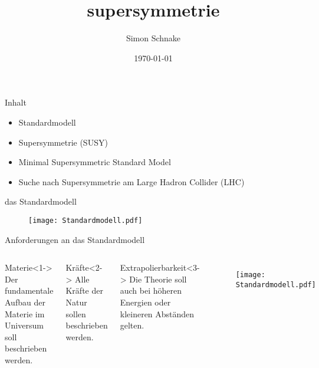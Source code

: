 \documentclass[10pt]{beamer}
\title{supersymmetrie}
\date{\today}
\author{Simon Schnake}
\institute{Universität Hamburg}
\begin{document}
  \maketitle
  
  \begin{frame}{Inhalt}
\begin{itemize}[<+- | alert@+>]
	\item Standardmodell
	\item Supersymmetrie (SUSY)
	\item Minimal Supersymmetric Standard Model
	\item Suche nach Supersymmetrie am Large Hadron Collider (LHC)
\end{itemize}
\end{frame}
  
  
\begin{frame}{das Standardmodell}
	\begin{figure}[htp]
    	\texttt{[image: Standardmodell.pdf]}
    \end{figure}
\end{frame}  

\begin{frame}{Anforderungen an das Standardmodell}
  \begin{columns}[c,onlytextwidth]
		\begin{block}{Materie}<1->
		Der fundamentale Aufbau der Materie im Universum soll beschrieben werden.
		\end{block}
		\begin{block}{Kräfte}<2->
		Alle Kräfte der Natur sollen beschrieben werden.
		\end{block}
		\begin{block}{Extrapolierbarkeit}<3->
		Die Theorie soll auch bei höheren Energien oder kleineren Abständen gelten.
		\end{block} 
		\begin{figure}[htp]
    	\texttt{[image: Standardmodell.pdf]}
    	\end{figure}
  \end{columns}
\end{frame}
\end{document}

